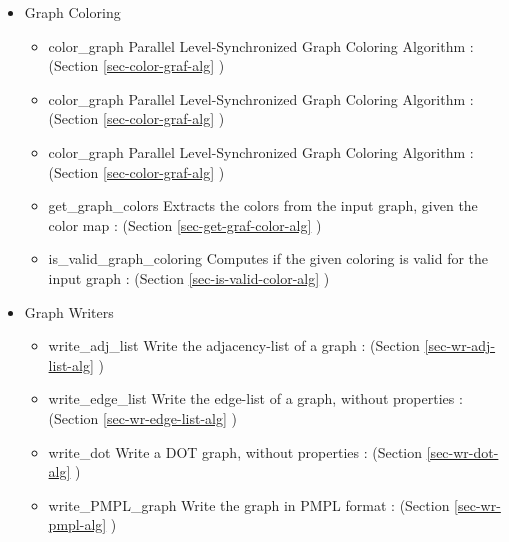 \begin{itemize}
\item
Graph Coloring
\begin{itemize}
\item
color\_graph 
\newline
Parallel Level-Synchronized Graph Coloring Algorithm
 : (Section \ref{sec-color-graf-alg} )
\item
color\_graph 
\newline
Parallel Level-Synchronized Graph Coloring Algorithm
 : (Section \ref{sec-color-graf-alg} )
\item
color\_graph 
\newline
Parallel Level-Synchronized Graph Coloring Algorithm
 : (Section \ref{sec-color-graf-alg} )
\item
get\_graph\_colors 
\newline
Extracts the colors from the input graph, given the color map
 : (Section \ref{sec-get-graf-color-alg} )
\item
is\_valid\_graph\_coloring 
\newline
Computes if the given coloring is valid for the input graph
 : (Section \ref{sec-is-valid-color-alg} )
\end{itemize}

\item
Graph Writers
\begin{itemize}
\item
write\_adj\_list 
\newline
Write the adjacency-list of a graph
 : (Section \ref{sec-wr-adj-list-alg} )
\item
write\_edge\_list 
\newline
Write the edge-list of a graph, without properties
 : (Section \ref{sec-wr-edge-list-alg} )
\item
write\_dot 
\newline
Write a DOT graph, without properties
 : (Section \ref{sec-wr-dot-alg} )
\item
write\_PMPL\_graph 
\newline
Write the graph in PMPL format
 : (Section \ref{sec-wr-pmpl-alg} )
\end{itemize}


\end{itemize}
